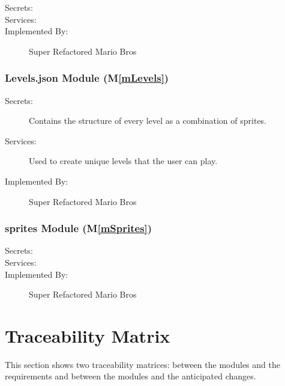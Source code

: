 \documentclass[12pt, titlepage]{article}
\newcommand{\mref}[1]{M\ref{#1}}
\begin{document}
\begin{description}
\item[Secrets:] 
\item[Services:] 
\item[Implemented By:] Super Refactored Mario Bros
\end{description}

\subsubsection{Levels.json Module (\mref{mLevels})}

\begin{description}
\item[Secrets:] Contains the structure of every level as a combination of sprites.
\item[Services:] Used to create unique levels that the user can play.
\item[Implemented By:] Super Refactored Mario Bros
\end{description}

\subsubsection{sprites Module (\mref{mSprites})}

\begin{description}
\item[Secrets:] 
\item[Services:] 
\item[Implemented By:] Super Refactored Mario Bros
\end{description}

\section{Traceability Matrix} \label{SecTM}

This section shows two traceability matrices: between the modules and the
requirements and between the modules and the anticipated changes.
\end{document}
